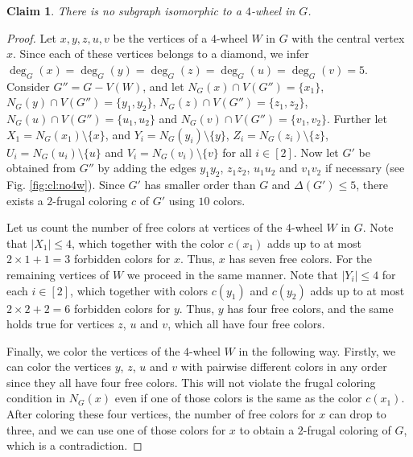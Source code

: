 \documentclass[11pt]{article}
\newtheorem{claim}{Claim}
\begin{document}
\begin{claim} There is no subgraph isomorphic to a $4$-wheel in $G$.
\label{cl:no4w}
\end{claim}
\begin{proof}
Let $x,y,z,u,v$ be the vertices of a $4$-wheel $W$ in $G$ with the central vertex $x$. Since each of these vertices belongs to a diamond, we infer $\deg_G(x)=\deg_G(y)=\deg_G(z)=\deg_G(u)=\deg_G(v)=5$.  Consider $G''=G-V(W)$, and let $N_G(x) \cap V(G'')=\{x_1\}$, $N_G(y) \cap V(G'')=\{y_1,y_2\}$, $N_G(z) \cap V(G'')=\{z_1,z_2\}$, $N_G(u) \cap V(G'')=\{u_1,u_2\}$ and $N_G(v) \cap V(G'')=\{v_1,v_2\}$. Further let $X_1=N_G(x_1)\setminus\{x\}$, and $Y_i=N_G(y_i)\setminus\{y\}$, $Z_i=N_G(z_i)\setminus\{z\}$, $U_i=N_G(u_i)\setminus\{u\}$ and $V_i=N_G(v_i)\setminus\{v\}$ for all $i \in [2]$. Now let $G'$ be obtained from $G''$ by adding the edges $y_1y_2$, $z_1z_2$, $u_1u_2$ and $v_1v_2$ if necessary (see Fig. \ref{fig:cl:no4w}). Since $G'$ has smaller order than $G$ and $\Delta(G') \le 5$, there exists a $2$-frugal coloring $c$ of $G'$ using $10$ colors.

Let us count the number of free colors at vertices of the $4$-wheel $W$ in $G$. Note that $|X_1| \le 4$, which together with the color $c(x_1)$ adds up to at most $2 \times 1 + 1=3$ forbidden colors for $x$. Thus, $x$ has seven free colors. For the remaining vertices of $W$ we proceed in the same manner. Note that $|Y_i| \le 4$ for each $i\in [2]$, which together with colors $c(y_1)$ and $c(y_2)$ adds up to at most $2 \times 2 + 2=6$ forbidden colors for $y$. Thus, $y$ has four free colors, and the same holds true for vertices $z$, $u$ and $v$, which all have four free colors.

Finally, we color the vertices of the $4$-wheel $W$ in the following way. Firstly, we can color the vertices $y$, $z$, $u$ and $v$ with pairwise different colors in any order since they all have four free colors. This will not violate the frugal coloring condition in $N_G(x)$ even if one of those colors is the same as the color $c(x_1)$. After coloring these four vertices,  the number of free colors for $x$ can drop to three, and we can use one of those colors for $x$ to obtain a $2$-frugal coloring of $G$, which is a contradiction.
\end{proof}
\end{document}
